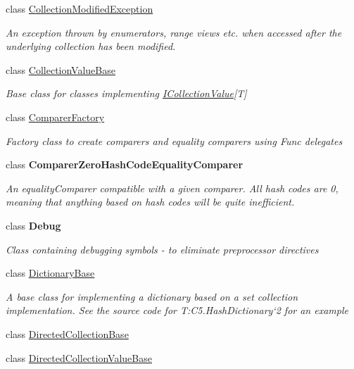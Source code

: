 \begin{DoxyCompactItemize}
class \hyperlink{class_c5_1_1_collection_modified_exception}{Collection\+Modified\+Exception}
\begin{DoxyCompactList}\small\item\em An exception thrown by enumerators, range views etc. when accessed after the underlying collection has been modified. \end{DoxyCompactList}\item 
class \hyperlink{class_c5_1_1_collection_value_base}{Collection\+Value\+Base}
\begin{DoxyCompactList}\small\item\em Base class for classes implementing \hyperlink{interface_c5_1_1_i_collection_value}{I\+Collection\+Value}\mbox{[}T\mbox{]} \end{DoxyCompactList}\item 
class \hyperlink{class_c5_1_1_comparer_factory}{Comparer\+Factory}
\begin{DoxyCompactList}\small\item\em Factory class to create comparers and equality comparers using Func delegates \end{DoxyCompactList}\item 
class {\bfseries Comparer\+Zero\+Hash\+Code\+Equality\+Comparer}
\begin{DoxyCompactList}\small\item\em An equality\+Comparer compatible with a given comparer. All hash codes are 0, meaning that anything based on hash codes will be quite inefficient. \end{DoxyCompactList}\item 
class {\bfseries Debug}
\begin{DoxyCompactList}\small\item\em Class containing debugging symbols -\/ to eliminate preprocessor directives \end{DoxyCompactList}\item 
class \hyperlink{class_c5_1_1_dictionary_base}{Dictionary\+Base}
\begin{DoxyCompactList}\small\item\em A base class for implementing a dictionary based on a set collection implementation. {\itshape See the source code for T\+:\+C5.\+Hash\+Dictionary`2 for an example} \end{DoxyCompactList}\item 
class \hyperlink{class_c5_1_1_directed_collection_base}{Directed\+Collection\+Base}
\item 
class \hyperlink{class_c5_1_1_directed_collection_value_base}{Directed\+Collection\+Value\+Base}

\end{DoxyCompactItemize}
